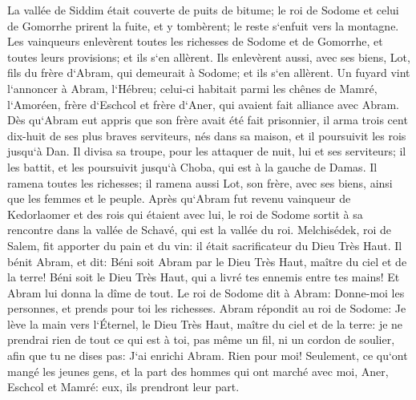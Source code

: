 \verse La vallée de Siddim était couverte de puits de bitume; le roi de Sodome et celui de Gomorrhe prirent la fuite, et y tombèrent; le reste s`enfuit vers la montagne. 
\verse Les vainqueurs enlevèrent toutes les richesses de Sodome et de Gomorrhe, et toutes leurs provisions; et ils s`en allèrent. 
\verse Ils enlevèrent aussi, avec ses biens, Lot, fils du frère d`Abram, qui demeurait à Sodome; et ils s`en allèrent. 
\verse Un fuyard vint l`annoncer à Abram, l`Hébreu; celui-ci habitait parmi les chênes de Mamré, l`Amoréen, frère d`Eschcol et frère d`Aner, qui avaient fait alliance avec Abram. 
\verse Dès qu`Abram eut appris que son frère avait été fait prisonnier, il arma trois cent dix-huit de ses plus braves serviteurs, nés dans sa maison, et il poursuivit les rois jusqu`à Dan. 
\verse Il divisa sa troupe, pour les attaquer de nuit, lui et ses serviteurs; il les battit, et les poursuivit jusqu`à Choba, qui est à la gauche de Damas. 
\verse Il ramena toutes les richesses; il ramena aussi Lot, son frère, avec ses biens, ainsi que les femmes et le peuple. 
\verse Après qu`Abram fut revenu vainqueur de Kedorlaomer et des rois qui étaient avec lui, le roi de Sodome sortit à sa rencontre dans la vallée de Schavé, qui est la vallée du roi. 
\verse Melchisédek, roi de Salem, fit apporter du pain et du vin: il était sacrificateur du Dieu Très Haut. 
\verse Il bénit Abram, et dit: Béni soit Abram par le Dieu Très Haut, maître du ciel et de la terre! 
\verse Béni soit le Dieu Très Haut, qui a livré tes ennemis entre tes mains! Et Abram lui donna la dîme de tout. 
\verse Le roi de Sodome dit à Abram: Donne-moi les personnes, et prends pour toi les richesses. 
\verse Abram répondit au roi de Sodome: Je lève la main vers l`Éternel, le Dieu Très Haut, maître du ciel et de la terre: 
\verse je ne prendrai rien de tout ce qui est à toi, pas même un fil, ni un cordon de soulier, afin que tu ne dises pas: J`ai enrichi Abram. Rien pour moi! 
\verse Seulement, ce qu`ont mangé les jeunes gens, et la part des hommes qui ont marché avec moi, Aner, Eschcol et Mamré: eux, ils prendront leur part. 

